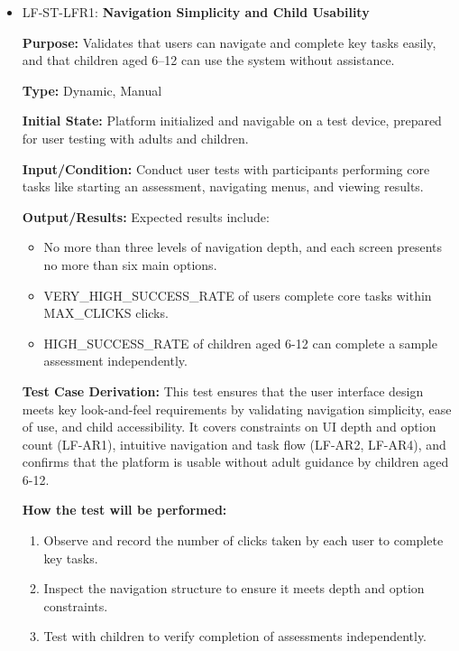 \documentclass[12pt, titlepage]{article}
\begin{document}
\begin{itemize} 
  \item LF-ST-LFR1: \textbf{Navigation Simplicity and Child Usability}
  \begin{mdframed}[linewidth=0.5mm] 
    \textbf{Purpose:} Validates that users can navigate and complete key tasks easily, and that children aged 6–12 can use the system without assistance. \par
    \textbf{Type:} Dynamic, Manual \par 
    \textbf{Initial State:} Platform initialized and navigable on a test device, prepared for user testing with adults and children. \par 
    \textbf{Input/Condition:} Conduct user tests with participants performing core tasks like starting an assessment, navigating menus, and viewing results. \par 
    \textbf{Output/Results:} Expected results include: 
    \begin{itemize} 
      \item No more than three levels of navigation depth, and each screen presents no more than six main options. 
      \item VERY\_HIGH\_SUCCESS\_RATE of users complete core tasks within \\ MAX\_CLICKS clicks. 
      \item HIGH\_SUCCESS\_RATE of children aged 6-12 can complete a sample \\ assessment independently. 
    \end{itemize} \par
    \textbf{Test Case Derivation:} This test ensures that the user interface design meets key look-and-feel requirements by validating navigation simplicity, ease of use, and child accessibility. It covers constraints on UI depth and option count (LF-AR1), intuitive navigation and task flow (LF-AR2, LF-AR4), and confirms that the platform is usable without adult guidance by children aged 6-12. \par
    \textbf{How the test will be performed:} 
    \begin{enumerate}[noitemsep] 
      \item Observe and record the number of clicks taken by each user to complete key tasks. 
      \item Inspect the navigation structure to ensure it meets depth and option \\ constraints. 
      \item Test with children to verify completion of assessments independently. 
    \end{enumerate} 
  \end{mdframed}


\end{itemize}
\end{document}
